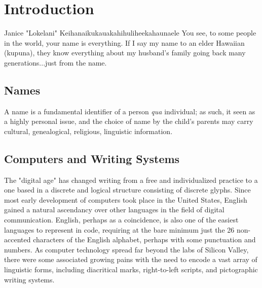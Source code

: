 \section{Introduction}

\begin{aquote}{Janice "Lokelani" Keihanaikukauakahihuliheekahaunaele}
You see, to some people in the world, your name is everything. If I say my name
to an elder Hawaiian (kupuna), they know everything about my husband's family
going back many generations...just from the name.
\end{aquote}

\subsection{Names}

A name is a fundamental identifier of a person \textit{qua} individual; as such,
it seen as a highly personal issue, and the choice of name by the child's
parents may carry cultural, genealogical, religious, linguistic information. 

\subsection{Computers and Writing Systems}

The "digital age" has changed writing from a free and individualized practice to
a one based in a discrete and logical structure consisting of discrete glyphs.
Since most early development of computers took place in the United States,
English gained a natural ascendancy over other languages in the field of digital
communication. English, perhaps as a coincidence, is also one of the easiest
languages to represent in code, requiring at the bare minimum just the 26
non-accented characters of the English alphabet, perhaps with some punctuation
and numbers. As computer technology spread far beyond the labs of Silicon
Valley, there were some associated growing pains with the need to encode a vast
array of linguistic forms, including diacritical marks, right-to-left scripts,
and pictographic writing systems.
